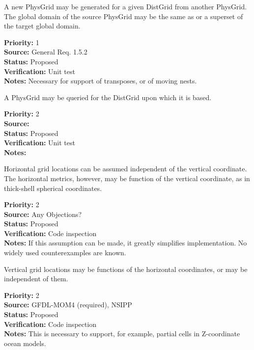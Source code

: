 A new PhysGrid may be generated for a given DistGrid from another PhysGrid.
The global domain of the source PhysGrid may be the same as or a superset of
the target global domain.
\begin{reqlist}
{\bf Priority:} 1 \\
{\bf Source:} General Req. 1.5.2 \\
{\bf Status:} Proposed \\
{\bf Verification:} Unit test\\
{\bf Notes:} Necessary for support of transposes, or of moving nests.
\end{reqlist}

A PhysGrid may be queried for the DistGrid upon which it is based.
\begin{reqlist}
{\bf Priority:} 2 \\
{\bf Source:} \\
{\bf Status:} Proposed \\
{\bf Verification:} Unit test \\
{\bf Notes:} 
\end{reqlist}

Horizontal grid locations can be assumed independent of the vertical coordinate.
The horizontal metrics, however, may be function of the vertical coordinate, as
in thick-shell spherical coordinates.
\begin{reqlist}
{\bf Priority:} 2 \\
{\bf Source:} Any Objections? \\
{\bf Status:} Proposed \\
{\bf Verification:} Code inspection\\
{\bf Notes:} If this assumption can be made, it greatly simplifies implementation.
No widely used counterexamples are known.
\end{reqlist}

Vertical grid locations may be functions of the horizontal coordinates, or may be
independent of them.
\begin{reqlist}
{\bf Priority:} 2 \\
{\bf Source:} GFDL-MOM4 (required), NSIPP \\
{\bf Status:} Proposed \\
{\bf Verification:} Code inspection\\
{\bf Notes:} This is necessary to support, for example, partial cells in
Z-coordinate ocean models.
\end{reqlist}

